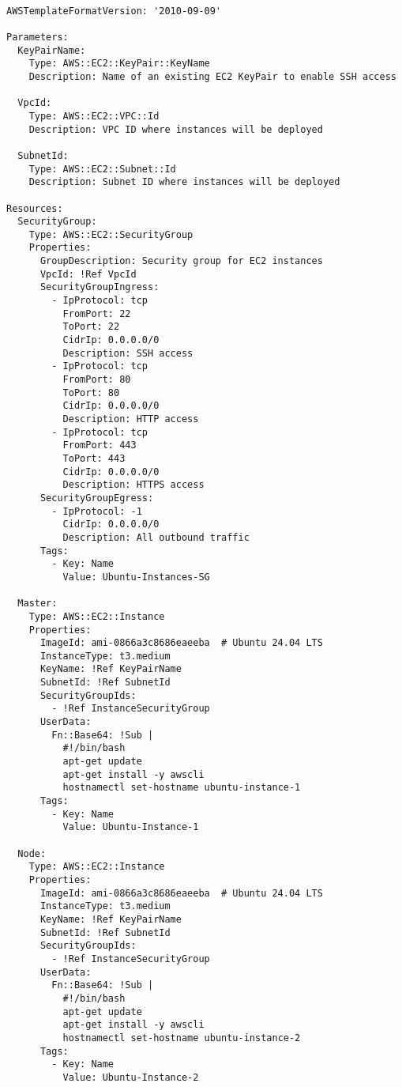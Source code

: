 \begin{lstlisting}[caption={Skrypt AWS CloudFormation do wdrożenia klastra EKS}, label={lst:eks_cloudformation}]

AWSTemplateFormatVersion: '2010-09-09'

Parameters:
  KeyPairName:
    Type: AWS::EC2::KeyPair::KeyName
    Description: Name of an existing EC2 KeyPair to enable SSH access
    
  VpcId:
    Type: AWS::EC2::VPC::Id
    Description: VPC ID where instances will be deployed
    
  SubnetId:
    Type: AWS::EC2::Subnet::Id
    Description: Subnet ID where instances will be deployed

Resources:
  SecurityGroup:
    Type: AWS::EC2::SecurityGroup
    Properties:
      GroupDescription: Security group for EC2 instances
      VpcId: !Ref VpcId
      SecurityGroupIngress:
        - IpProtocol: tcp
          FromPort: 22
          ToPort: 22
          CidrIp: 0.0.0.0/0
          Description: SSH access
        - IpProtocol: tcp
          FromPort: 80
          ToPort: 80
          CidrIp: 0.0.0.0/0
          Description: HTTP access
        - IpProtocol: tcp
          FromPort: 443
          ToPort: 443
          CidrIp: 0.0.0.0/0
          Description: HTTPS access
      SecurityGroupEgress:
        - IpProtocol: -1
          CidrIp: 0.0.0.0/0
          Description: All outbound traffic
      Tags:
        - Key: Name
          Value: Ubuntu-Instances-SG

  Master:
    Type: AWS::EC2::Instance
    Properties:
      ImageId: ami-0866a3c8686eaeeba  # Ubuntu 24.04 LTS 
      InstanceType: t3.medium
      KeyName: !Ref KeyPairName
      SubnetId: !Ref SubnetId
      SecurityGroupIds:
        - !Ref InstanceSecurityGroup
      UserData:
        Fn::Base64: !Sub |
          #!/bin/bash
          apt-get update
          apt-get install -y awscli
          hostnamectl set-hostname ubuntu-instance-1
      Tags:
        - Key: Name
          Value: Ubuntu-Instance-1

  Node:
    Type: AWS::EC2::Instance
    Properties:
      ImageId: ami-0866a3c8686eaeeba  # Ubuntu 24.04 LTS
      InstanceType: t3.medium
      KeyName: !Ref KeyPairName
      SubnetId: !Ref SubnetId
      SecurityGroupIds:
        - !Ref InstanceSecurityGroup
      UserData:
        Fn::Base64: !Sub |
          #!/bin/bash
          apt-get update
          apt-get install -y awscli
          hostnamectl set-hostname ubuntu-instance-2
      Tags:
        - Key: Name
          Value: Ubuntu-Instance-2

\end{lstlisting}

